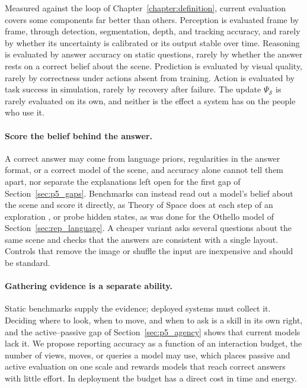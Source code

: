 Measured against the loop of Chapter~\ref{chapter:definition}, current evaluation covers some components far better than others.
Perception is evaluated frame by frame, through detection, segmentation, depth, and tracking accuracy, and rarely by whether its uncertainty is calibrated or its output stable over time.
Reasoning is evaluated by answer accuracy on static questions, rarely by whether the answer rests on a correct belief about the scene.
Prediction is evaluated by visual quality, rarely by correctness under actions absent from training.
Action is evaluated by task success in simulation, rarely by recovery after failure.
The update $\Psi_{\mathcal{S}}$ is rarely evaluated on its own, and neither is the effect a system has on the people who use it.

\paragraph{Score the belief behind the answer.}
A correct answer may come from language priors, regularities in the answer format, or a correct model of the scene, and accuracy alone cannot tell them apart, nor separate the explanations left open for the first gap of Section~\ref{sec:p5_gaps}.
Benchmarks can instead read out a model's belief about the scene and score it directly, as Theory of Space does at each step of an exploration \cite{zhang2026theory}, or probe hidden states, as was done for the Othello model of Section~\ref{sec:rep_language}.
A cheaper variant asks several questions about the same scene and checks that the answers are consistent with a single layout.
Controls that remove the image or shuffle the input are inexpensive and should be standard.

\paragraph{Gathering evidence is a separate ability.}
Static benchmarks supply the evidence; deployed systems must collect it.
Deciding where to look, when to move, and when to ask is a skill in its own right, and the active--passive gap of Section~\ref{sec:p5_agency} shows that current models lack it.
We propose reporting accuracy as a function of an interaction budget, the number of views, moves, or queries a model may use, which places passive and active evaluation on one scale and rewards models that reach correct answers with little effort.
In deployment the budget has a direct cost in time and energy.

